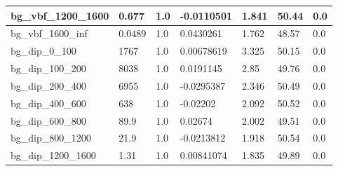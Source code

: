 \documentclass[a4paper, 10pt]{article}
\begin{document}
\begin{table}[H]
\begin{center}
\begin{tabular}{|m{23.0mm}|m{23.0mm}|m{18.0mm}|m{19.0mm}|m{19.0mm}|m{19.0mm}|m{19.0mm}|}
      \hline
      {\cellcolor{white}         bg\_vbf\_1200\_1600}& {\cellcolor{white}         0.677}& {\cellcolor{white}         1.0}& {\cellcolor{white}         -0.0110501}& {\cellcolor{white}         1.841}& {\cellcolor{red}         50.44}& {\cellcolor{red}         0.0}\\
      \hline
      {\cellcolor{white}         bg\_vbf\_1600\_inf}& {\cellcolor{white}         0.0489}& {\cellcolor{white}         1.0}& {\cellcolor{white}         0.0430261}& {\cellcolor{white}         1.762}& {\cellcolor{red}         48.57}& {\cellcolor{red}         0.0}\\
      \hline
      {\cellcolor{white}         bg\_dip\_0\_100}& {\cellcolor{white}         1767}& {\cellcolor{white}         1.0}& {\cellcolor{white}         0.00678619}& {\cellcolor{white}         3.325}& {\cellcolor{red}         50.15}& {\cellcolor{red}         0.0}\\
      \hline
      {\cellcolor{white}         bg\_dip\_100\_200}& {\cellcolor{white}         8038}& {\cellcolor{white}         1.0}& {\cellcolor{white}         0.0191145}& {\cellcolor{white}         2.85}& {\cellcolor{red}         49.76}& {\cellcolor{red}         0.0}\\
      \hline
      {\cellcolor{white}         bg\_dip\_200\_400}& {\cellcolor{white}         6955}& {\cellcolor{white}         1.0}& {\cellcolor{white}         -0.0295387}& {\cellcolor{white}         2.346}& {\cellcolor{red}         50.49}& {\cellcolor{red}         0.0}\\
      \hline
      {\cellcolor{white}         bg\_dip\_400\_600}& {\cellcolor{white}         638}& {\cellcolor{white}         1.0}& {\cellcolor{white}         -0.02202}& {\cellcolor{white}         2.092}& {\cellcolor{red}         50.52}& {\cellcolor{red}         0.0}\\
      \hline
      {\cellcolor{white}         bg\_dip\_600\_800}& {\cellcolor{white}         89.9}& {\cellcolor{white}         1.0}& {\cellcolor{white}         0.02674}& {\cellcolor{white}         2.002}& {\cellcolor{red}         49.51}& {\cellcolor{red}         0.0}\\
      \hline
      {\cellcolor{white}         bg\_dip\_800\_1200}& {\cellcolor{white}         21.9}& {\cellcolor{white}         1.0}& {\cellcolor{white}         -0.0213812}& {\cellcolor{white}         1.918}& {\cellcolor{red}         50.54}& {\cellcolor{red}         0.0}\\
      \hline
      {\cellcolor{white}         bg\_dip\_1200\_1600}& {\cellcolor{white}         1.31}& {\cellcolor{white}         1.0}& {\cellcolor{white}         0.00841074}& {\cellcolor{white}         1.835}& {\cellcolor{red}         49.89}& {\cellcolor{red}         0.0}\\

\end{tabular}
\end{center}
\end{table}
\end{document}
